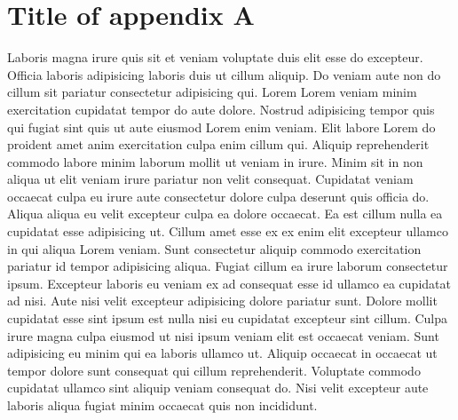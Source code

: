 \appendix
\chapter{Title of appendix A}


Laboris magna irure quis sit et veniam voluptate duis elit esse do excepteur. Officia laboris adipisicing laboris duis ut cillum aliquip. Do veniam aute non do cillum sit pariatur consectetur adipisicing qui. Lorem Lorem veniam minim exercitation cupidatat tempor do aute dolore. Nostrud adipisicing tempor quis qui fugiat sint quis ut aute eiusmod Lorem enim veniam. Elit labore Lorem do proident amet anim exercitation culpa enim cillum qui. Aliquip reprehenderit commodo labore minim laborum mollit ut veniam in irure. Minim sit in non aliqua ut elit veniam irure pariatur non velit consequat. Cupidatat veniam occaecat culpa eu irure aute consectetur dolore culpa deserunt quis officia do. Aliqua aliqua eu velit excepteur culpa ea dolore occaecat. Ea est cillum nulla ea cupidatat esse adipisicing ut. Cillum amet esse ex ex enim elit excepteur ullamco in qui aliqua Lorem veniam. Sunt consectetur aliquip commodo exercitation pariatur id tempor adipisicing aliqua. Fugiat cillum ea irure laborum consectetur ipsum. Excepteur laboris eu veniam ex ad consequat esse id ullamco ea cupidatat ad nisi. Aute nisi velit excepteur adipisicing dolore pariatur sunt. Dolore mollit cupidatat esse sint ipsum est nulla nisi eu cupidatat excepteur sint cillum. Culpa irure magna culpa eiusmod ut nisi ipsum veniam elit est occaecat veniam. Sunt adipisicing eu minim qui ea laboris ullamco ut. Aliquip occaecat in occaecat ut tempor dolore sunt consequat qui cillum reprehenderit. Voluptate commodo cupidatat ullamco sint aliquip veniam consequat do. Nisi velit excepteur aute laboris aliqua fugiat minim occaecat quis non incididunt.
